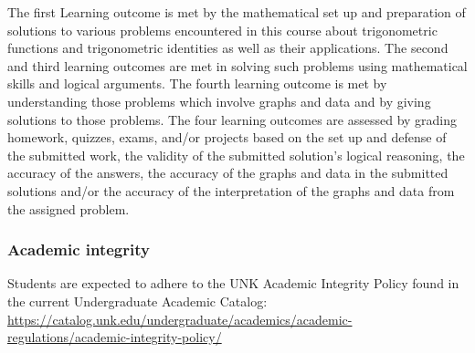 \documentclass[12pt]{article}
\newcounter{ex}\setcounter{ex}{0}
\begin{document}
The first Learning outcome is met by the mathematical set up and 
preparation of solutions to various problems encountered in this 
course about trigonometric functions and trigonometric identities 
as well as their applications. The second and third learning 
outcomes are met in solving such problems using mathematical 
skills and logical arguments. The fourth learning outcome is met 
by understanding those problems which involve graphs and data and by 
giving solutions to those problems. The four learning outcomes are 
assessed by grading homework, quizzes, exams, and/or projects based 
on the set up and defense of the submitted work, the validity of the 
submitted solution’s logical reasoning, the accuracy of the answers, 
the accuracy of the graphs and data in the submitted solutions 
and/or the accuracy of the interpretation 
of the graphs and data from the assigned problem.

\subsubsection*{Academic integrity} Students are expected to adhere to 
the UNK Academic Integrity Policy found in the current Undergraduate 
Academic Catalog: 
\url{https://catalog.unk.edu/undergraduate/academics/academic-regulations/academic-integrity-policy/}
\end{document}
